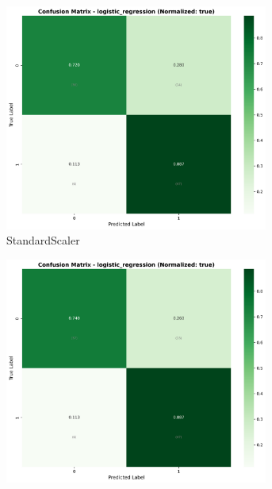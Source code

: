 \begin{figure}[H]\centering
\begin{subfigure}[b]{0.31\textwidth}\centering
\includegraphics[width=0.95\textwidth]{Result/heart_dataset/confusion_matrices/logistic_regression_numeric_dataset_StandardScaler.png}
\caption{StandardScaler}\label{fig:logreg_heart_cm_standard}
\end{subfigure}\hfill
\begin{subfigure}[b]{0.31\textwidth}\centering
\includegraphics[width=0.95\textwidth]{Result/heart_dataset/confusion_matrices/logistic_regression_numeric_dataset_MinMaxScaler.png}

\end{subfigure}
\end{figure}
